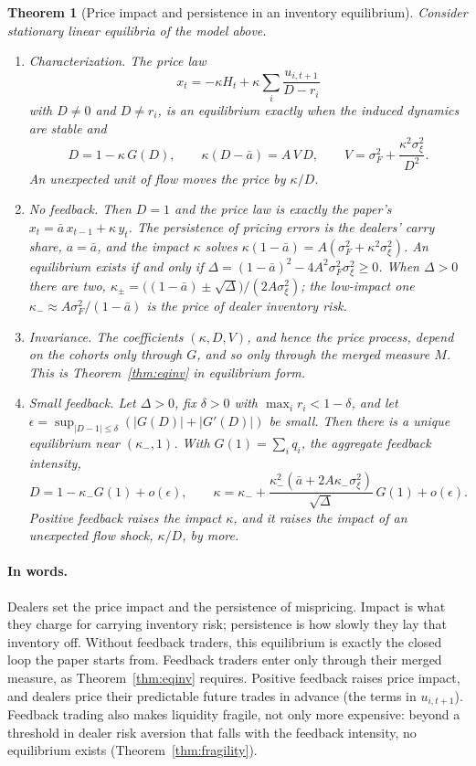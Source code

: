 \documentclass[12pt]{article}
\newtheorem{theorem}{Theorem}[section]
\theoremstyle{definition}
\theoremstyle{remark}
\begin{document}
\begin{theorem}[Price impact and persistence in an inventory equilibrium]\label{thm:inventory}
Consider stationary linear equilibria of the model above.
\begin{enumerate}[label=(\roman*),itemsep=1pt]
\item \emph{Characterization.} The price law
\[
 x_t=-\kappa H_t+\kappa\sum_i\frac{u_{i,t+1}}{D-r_i}
\]
with $D\ne0$ and $D\ne r_i$, is an equilibrium exactly when the induced dynamics are stable and
\begin{equation}\label{eq:inventory_eq}
 D=1-\kappa\,G(D),\qquad \kappa(D-\bar a)=A\,V\,D,\qquad V=\sigma_F^2+\frac{\kappa^2\sigma_\xi^2}{D^2}.
\end{equation}
An unexpected unit of flow moves the price by $\kappa/D$.
\item \emph{No feedback.} Then $D=1$ and the price law is exactly the paper's $x_t=\bar a\,x_{t-1}+\kappa\,y_t$. The persistence of pricing errors is the dealers' carry share, $a=\bar a$, and the impact $\kappa$ solves $\kappa(1-\bar a)=A(\sigma_F^2+\kappa^2\sigma_\xi^2)$. An equilibrium exists if and only if $\Delta=(1-\bar a)^2-4A^2\sigma_F^2\sigma_\xi^2\ge0$. When $\Delta>0$ there are two, $\kappa_\pm=\bigl((1-\bar a)\pm\sqrt\Delta\bigr)/(2A\sigma_\xi^2)$; the low-impact one $\kappa_-\approx A\sigma_F^2/(1-\bar a)$ is the price of dealer inventory risk.
\item \emph{Invariance.} The coefficients $(\kappa,D,V)$, and hence the price process, depend on the cohorts only through $G$, and so only through the merged measure $M$. This is Theorem~\ref{thm:eqinv} in equilibrium form.
\item \emph{Small feedback.} Let $\Delta>0$, fix $\delta>0$ with $\max_ir_i<1-\delta$, and let $\epsilon=\sup_{|D-1|\le\delta}(|G(D)|+|G'(D)|)$ be small. Then there is a unique equilibrium near $(\kappa_-,1)$. With $G(1)=\sum_iq_i$, the aggregate feedback intensity,
\[
 D=1-\kappa_-G(1)+o(\epsilon),\qquad \kappa=\kappa_-+\frac{\kappa_-^2(\bar a+2A\kappa_-\sigma_\xi^2)}{\sqrt\Delta}\,G(1)+o(\epsilon).
\]
Positive feedback raises the impact $\kappa$, and it raises the impact of an unexpected flow shock, $\kappa/D$, by more.
\end{enumerate}
\end{theorem}

\paragraph{In words.} Dealers set the price impact and the persistence of mispricing. Impact is what they charge for carrying inventory risk; persistence is how slowly they lay that inventory off. Without feedback traders, this equilibrium is exactly the closed loop the paper starts from. Feedback traders enter only through their merged measure, as Theorem~\ref{thm:eqinv} requires. Positive feedback raises price impact, and dealers price their predictable future trades in advance (the terms in $u_{i,t+1}$). Feedback trading also makes liquidity fragile, not only more expensive: beyond a threshold in dealer risk aversion that falls with the feedback intensity, no equilibrium exists (Theorem~\ref{thm:fragility}).
\end{document}
